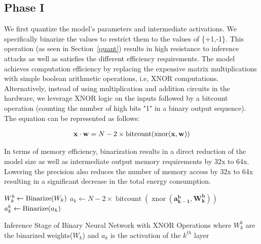


\subsection{Phase I}
\label{p1}

We first quantize the model's parameters and intermediate activations. We specifically binarize the values to restrict them to the values of \{+1,-1\}.
This operation (as seen in Section~\ref{quant}) results in high resistance to inference attacks as well as satisfies the different efficiency requirements.
The model achieves computation efficiency by replacing the expensive matrix multiplications with simple boolean arithmetic operations, i.e, XNOR computations.
Alternatively, instead of using multiplication and addition circuits in the hardware, we leverage XNOR logic on the inputs followed by a bitcount operation (counting the number of high bits "1" in a binary output sequence).
The equation can be represented as follows:

\begin{align}
\footnotesize
\mathbf{x} \cdot \mathbf{w} =
N - 2\times\operatorname{bitcount}(\operatorname{xnor}(\mathbf{x}, \mathbf{w}))
\end{align}

In terms of memory efficiency, binarization results in a direct reduction of the model size as well as intermediate output memory requirements by 32x to 64x.
Lowering the precision also reduces the number of memory access by 32x to 64x resulting in a significant decrease in the total energy consumption.


\begin{algorithm}
\footnotesize
\begin{algorithmic}
        \STATE $W_k^b \leftarrow {\rm Binarize}(W_k)$
        \STATE $a_k \leftarrow N - 2\times\operatorname{bitcount}(\operatorname{xnor}(\mathbf{a_{k-1}^b}, \mathbf{W_k^b}))$
            \STATE $a_k^b \leftarrow {\rm Binarize}(a_k)$
        \ENDIF
    \ENDFOR
\end{algorithmic}
\caption{Inference Stage of Binary Neural Network with XNOR Operations where $W_k^b$ are the binarized weights($W_k$) and $a_k$ is the activation of the $k^{th}$ layer}
\label{alg:inference}
\end{algorithm}


